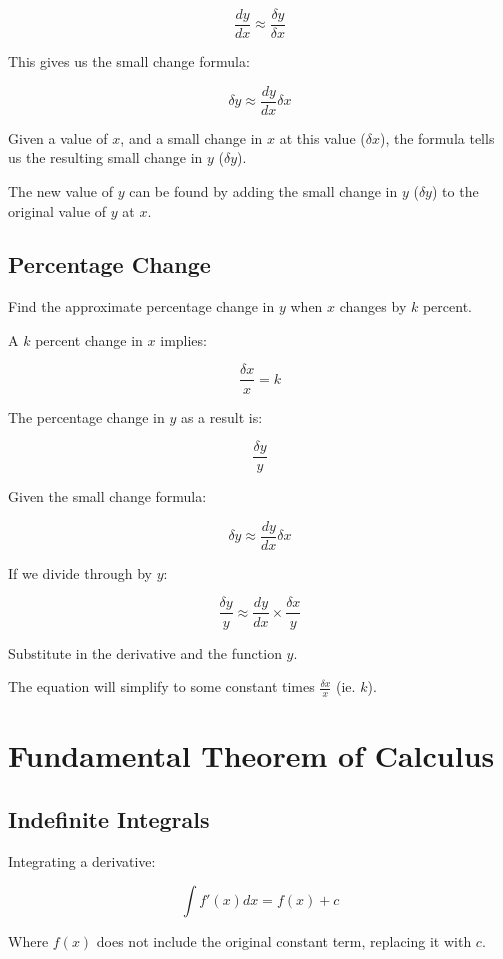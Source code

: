 \documentclass[a4paper,11pt]{article}
\begin{document}
$$
\frac{dy}{dx} \approx \frac{\delta y}{\delta x}
$$

This gives us the small change formula:

$$
\delta y \approx \frac{dy}{dx} \delta x
$$

Given a value of $x$, and a small change in $x$ at this value ($\delta x$), the
formula tells us the resulting small change in $y$ ($\delta y$).

The new value of $y$ can be found by adding the small change in $y$
($\delta y$) to the original value of $y$ at $x$.


\subsection{Percentage Change}

Find the approximate percentage change in $y$ when $x$ changes by $k$ percent.

A $k$ percent change in $x$ implies:

$$
\frac{\delta x}{x} = k
$$

The percentage change in $y$ as a result is:

$$
\frac{\delta y}{y}
$$

Given the small change formula:

$$
\delta y \approx \frac{dy}{dx} \delta x
$$

If we divide through by $y$:

$$
\frac{\delta y}{y} \approx \frac{dy}{dx} \times \frac{\delta x}{y}
$$

Substitute in the derivative and the function $y$.

The equation will simplify to some constant times $\frac{\delta x}{x}$
(ie. $k$).



\section{Fundamental Theorem of Calculus}

\subsection{Indefinite Integrals}

Integrating a derivative:

$$
\int f'(x) dx = f(x) + c
$$

Where $f(x)$ does not include the original constant term, replacing it with $c$.
\end{document}
